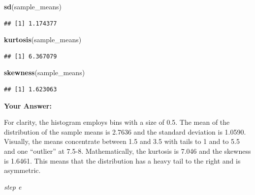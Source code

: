 \documentclass[
]{article}
\newenvironment{Shaded}{\begin{snugshade}}{\end{snugshade}}
\newcommand{\AttributeTok}[1]{\textcolor[rgb]{0.13,0.29,0.53}{#1}}
\newcommand{\ConstantTok}[1]{\textcolor[rgb]{0.56,0.35,0.01}{#1}}
\newcommand{\DecValTok}[1]{\textcolor[rgb]{0.00,0.00,0.81}{#1}}
\newcommand{\FunctionTok}[1]{\textcolor[rgb]{0.13,0.29,0.53}{\textbf{#1}}}
\newcommand{\NormalTok}[1]{#1}
\newcommand{\OtherTok}[1]{\textcolor[rgb]{0.56,0.35,0.01}{#1}}
\newcommand{\SpecialCharTok}[1]{\textcolor[rgb]{0.81,0.36,0.00}{\textbf{#1}}}
\begin{document}
\begin{Shaded}
\begin{Highlighting}[]
\FunctionTok{sd}\NormalTok{(sample\_means)}
\end{Highlighting}
\end{Shaded}

\begin{verbatim}
## [1] 1.174377
\end{verbatim}

\begin{Shaded}
\begin{Highlighting}[]
\FunctionTok{kurtosis}\NormalTok{(sample\_means)}
\end{Highlighting}
\end{Shaded}

\begin{verbatim}
## [1] 6.367079
\end{verbatim}

\begin{Shaded}
\begin{Highlighting}[]
\FunctionTok{skewness}\NormalTok{(sample\_means)}
\end{Highlighting}
\end{Shaded}

\begin{verbatim}
## [1] 1.623063
\end{verbatim}

\textbf{Your Answer:}

For clarity, the histogram employs bins with a size of 0.5. The mean of
the distribution of the sample means is 2.7636 and the standard
deviation is 1.0590. Visually, the means concentrate between 1.5 and 3.5
with tails to 1 and to 5.5 and one ``outlier'' at 7.5-8. Mathematically,
the kurtosis is 7.046 and the skewness is 1.6461. This means that the
distribution has a heavy tail to the right and is asymmetric.

\emph{step e}

\begin{Shaded}
\end{Shaded}
\end{document}
